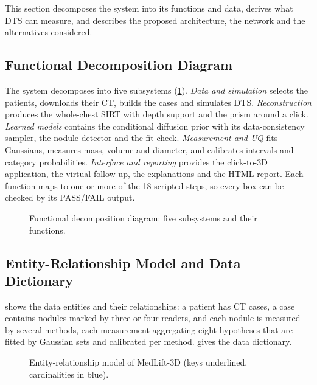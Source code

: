 This section decomposes the system into its functions and data, derives what DTS can measure, and describes the proposed architecture, the network and the alternatives considered.

\subsection{Functional Decomposition Diagram}

The system decomposes into five subsystems (\cref{fig:fdd}). \emph{Data and simulation} selects the patients, downloads their CT, builds the cases and simulates DTS. \emph{Reconstruction} produces the whole-chest SIRT with depth support and the prism around a click. \emph{Learned models} contains the conditional diffusion prior with its data-consistency sampler, the nodule detector and the fit check. \emph{Measurement and UQ} fits Gaussians, measures mass, volume and diameter, and calibrates intervals and category probabilities. \emph{Interface and reporting} provides the click-to-3D application, the virtual follow-up, the explanations and the HTML report. Each function maps to one or more of the 18 scripted steps, so every box can be checked by its PASS/FAIL output.

\begin{figure}[htbp]
  \centering
  \resizebox{\linewidth}{!}{}
  \caption{Functional decomposition diagram: five subsystems and their functions.}
  \label{fig:fdd}
\end{figure}

\subsection{Entity-Relationship Model and Data Dictionary}

 shows the data entities and their relationships: a patient has CT cases, a case contains nodules marked by three or four readers, and each nodule is measured by several methods, each measurement aggregating eight hypotheses that are fitted by Gaussian sets and calibrated per method.  gives the data dictionary.

\begin{figure}[htbp]
  \centering
  \resizebox{\linewidth}{!}{}
  \caption{Entity-relationship model of MedLift-3D (keys underlined, cardinalities in blue).}
  \label{fig:er}
\end{figure}


